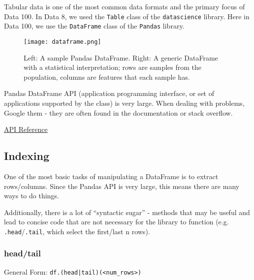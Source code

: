 Tabular data is one of the most common data formats and the primary focus of Data 100. In Data 8, we used the \texttt{Table} class of the \texttt{datascience} library. Here in Data 100, we use the \texttt{DataFrame} class of the \texttt{Pandas} library.
\begin{figure}[ht]
\begin{minipage}{0.5\textwidth}
\texttt{[image: dataframe.png]}\centering
\end{minipage}
\begin{minipage}{0.5\textwidth}
\begin{center}

\end{center}
\end{minipage}
\caption{Left: A sample Pandas DataFrame. Right: A generic DataFrame with a statistical interpretation; rows are samples from the population, columns are features that each sample has.}
\end{figure}
\begin{notebox}
Pandas DataFrame API (application programming interface, or set of applications supported by the class) is very large. When dealing with problems, Google them - they are often found in the documentation or stack overflow.

\href{https://pandas.pydata.org/docs/reference/api/pandas.DataFrame.html}{\color{blue}API Reference}
\end{notebox}

\subsection{Indexing}
One of the most basic tasks of manipulating a DataFrame is to extract rows/columns. Since the Pandas API is very large, this means there are many ways to do things.

Additionally, there is a lot of ``syntactic sugar'' - methods that may be useful and lead to concise code that are not necessary for the library to function (e.g. \texttt{.head}/\texttt{.tail}, which select the first/last n rows).

\subsubsection{head/tail}
General Form: \texttt{df.(head|tail)(<num_rows>)}

